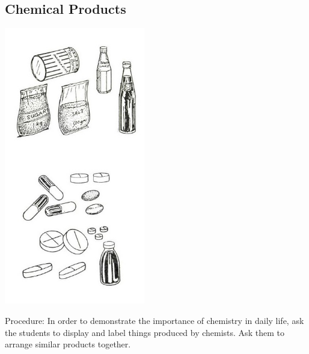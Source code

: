 \begin{multicols}{2}

\subsection{Chemical Products}

\begin{center}
\includegraphics[width=0.46\textwidth]{./img/source/chemical-products.jpg}
\end{center}

\begin{description*}
\item[Procedure:]{In order to demonstrate the importance of
chemistry in daily life, ask the students to display
and label things produced by chemists. Ask
them to arrange similar products together.}
\end{description*}


\end{multicols}
